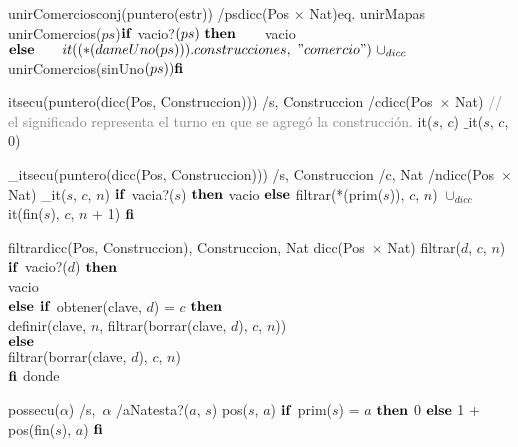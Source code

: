 \vspace{4mm}
\tadOperacion
{unirComercios}{conj(puntero(estr)) /ps}{dicc(Pos $\times$ Nat)}{eq. unirMapas} 
\tadAxioma
{unirComercios($ps$)}{$
    \textrm{\textbf{if}}\ $vacio?$(ps)\ \textrm{\textbf{then}}\ \\
    \hspace*{7mm} $vacio$\ \\
    \LELSE\ \\
    \tab it((*(dameUno(ps))).construcciones,\ "comercio")\ \cup_{dicc}\ $unirComercios(sinUno$(ps))\ \\
    \textrm{\textbf{fi}}
$}

\vspace{4mm}
\tadOperacion
{it}{secu(puntero(dicc(Pos, Construccion))) /s, Construccion /c}{dicc(Pos\ $\times$ Nat)}{}
\textcolor{gray}{// el significado representa el turno en que se agregó la construcción.}  
\tadAxioma
{it($s$, $c$)}{
    $\_$it($s$, $c$, 0)
}

\vspace{4mm}
\tadOperacion
{\_it}{secu(puntero(dicc(Pos, Construccion))) /s, Construccion /c, Nat /n}{dicc(Pos\ $\times$ Nat)}{}
\tadAxioma
{\_it($s$, $c$, $n$)}{
    $\textrm{\textbf{if}}$ vacia?($s$) $\textrm{\textbf{then}}$ 
        vacio 
    $\textrm{\textbf{else}}$ 
        filtrar(*(prim($s$)), $c$, $n$) $\cup_{dicc}$ it(fin($s$), $c$, $n$ + 1) 
    $\textrm{\textbf{fi}}$
}

\vspace{4mm}
\tadOperacion
{filtrar}{dicc(Pos, Construccion), Construccion, Nat }{dicc(Pos\ $\times$ Nat)}{}
\tadAxioma
{filtrar($d$, $c$, $n$)}{
    $\textrm{\textbf{if}}$ vacio?($d$) $\textrm{\textbf{then}}$ \\ 
    \tab vacio \\
    $\textrm{\textbf{else}}$ $\textrm{\textbf{if}}$ obtener(clave, $d$) = $c$ $\textrm{\textbf{then}}$ \\ 
    \tab definir(clave, $n$, filtrar(borrar(clave, $d$), $c$, $n$)) \\
    $\textrm{\textbf{else}}$ \\
    \tab filtrar(borrar(clave, $d$), $c$, $n$) \\
    $\textrm{\textbf{fi}}$
}
donde 

\vspace{4mm}
\tadOperacion
{pos}{secu($\alpha$) /s,\ $\alpha$ /a}{Nat}{esta?($a$, $s$)}
\tadAxioma
{pos($s$, $a$)}{
    $\textrm{\textbf{if}}$ prim($s$) = $a$ $\textrm{\textbf{then}}$ 0 $\textrm{\textbf{else}}$ 1 + pos(fin($s$), $a$) $\textrm{\textbf{fi}}$ 
}

